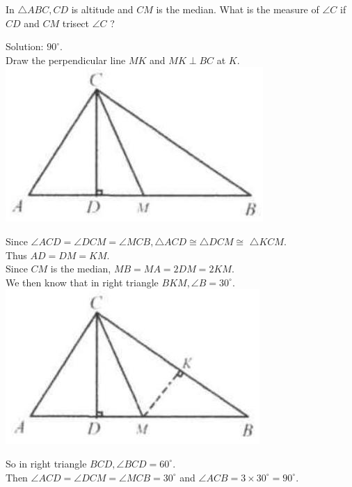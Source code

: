 \documentclass{article}
\begin{document}
In \(\triangle A B C, C D\) is altitude and \(C M\) is the median. What is the measure of \(\angle C\) if \(C D\) and \(C M\) trisect \(\angle C\) ?

Solution: \(90^{\circ}\).\\
Draw the perpendicular line \(M K\) and \(M K \perp B C\) at \(K\).\\
\centering
\includegraphics[width=\textwidth]{images/081(3).jpg}

Since \(\angle A C D=\angle D C M=\angle M C B, \triangle A C D \cong \triangle D C M \cong\) \(\triangle K C M\).\\
Thus \(A D=D M=K M\).\\
Since \(C M\) is the median, \(M B=M A=2 D M=2 K M\).\\
We then know that in right triangle \(B K M, \angle B=30^{\circ}\).\\
\centering
\includegraphics[width=\textwidth]{images/081(1).jpg}

So in right triangle \(B C D, \angle B C D=60^{\circ}\).\\
Then \(\angle A C D=\angle D C M=\angle M C B=30^{\circ}\) and \(\angle A C B=3 \times 30^{\circ}=90^{\circ}\).
\end{document}

